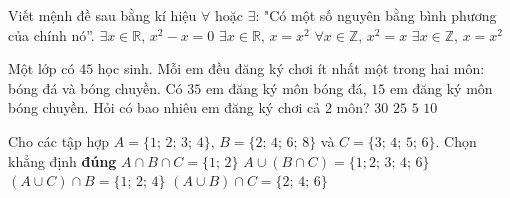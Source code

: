 \begin{ex}%
Viết mệnh đề sau bằng kí hiệu $\forall$ hoặc $\exists$: "Có một số nguyên bằng bình phương của chính nó''.
\choice
{$\exists x \in \mathbb{R},\,x^2-x=0$}
{$\exists x \in \mathbb{R},\,x=x^2$}
{$\forall x \in \mathbb{Z},\,x^2=x$}
{\True $\exists x \in \mathbb{Z},\,x=x^2$}
\end{ex}

\begin{ex}%
Một lớp có $ 45 $ học sinh. Mỗi em đều đăng ký chơi ít nhất một trong hai môn: bóng đá và bóng chuyền. Có $ 35 $ em đăng ký môn bóng đá, $ 15 $ em đăng ký môn bóng chuyền. Hỏi có bao nhiêu em đăng ký chơi cả $ 2 $ môn?
\choice
{ $ 30 $ }
{ $ 25 $ }
{\True $ 5 $ }
{ $ 10 $ }
\end{ex}

\begin{ex}%
Cho các tập hợp $A=\{1;\,2;\,3;\,4\}$, $B=\{2;\,4;\,6;\,8\}$ và $C=\{3;\,4;\,5;\,6\}$. Chọn khẳng định \textbf{đúng}
\choice
{$A\cap B\cap C=\{1;\,2\}$}
{\True $A\cup(B\cap C)=\{1;2;\,3;\,4;\,6\}$}
{$(A\cup C)\cap B=\{1;\,2;\,4\}$}
{$(A\cup B)\cap C=\{2;\,4;\,6\}$}
\end{ex}

